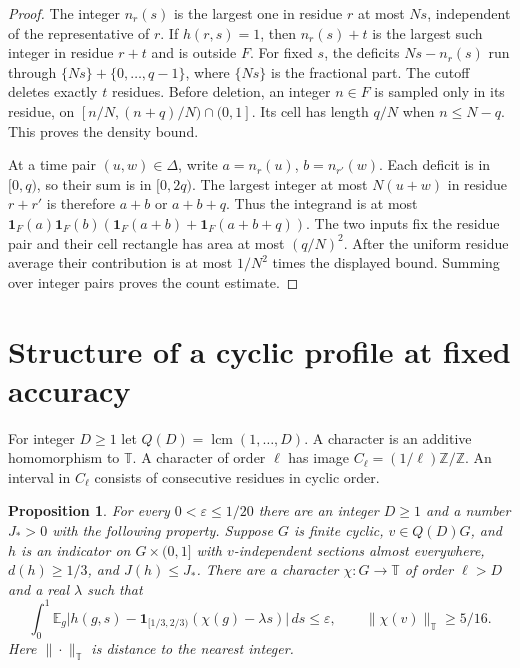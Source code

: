 \documentclass[11pt,reqno]{amsart}
\newtheorem{proposition}[theorem]{Proposition}
\DeclareMathOperator{\lcm}{lcm}
\newcommand{\Z}{\mathbb Z}
\newcommand{\T}{\mathbb T}
\newcommand{\E}{\mathbb E}
\newcommand{\ind}{\mathbf 1}
\numberwithin{equation}{section}
\begin{document}
\begin{proof}
The integer \(n_r(s)\) is the largest one in residue \(r\) at most
\(Ns\), independent of the representative of \(r\). If \(h(r,s)=1\),
then \(n_r(s)+t\) is the largest such integer in residue \(r+t\)
and is outside \(F\). For fixed \(s\), the deficits
\(Ns-n_r(s)\) run through \(\{Ns\}+\{0,\ldots,q-1\}\), where
\(\{Ns\}\) is the fractional part. The cutoff deletes exactly \(t\)
residues. Before deletion, an integer \(n\in F\) is sampled only
in its residue, on \([n/N,(n+q)/N)\cap(0,1]\). Its cell has
length \(q/N\) when \(n\le N-q\). This proves the density bound.

At a time pair \((u,w)\in\Delta\), write \(a=n_r(u)\),
\(b=n_{r'}(w)\). Each deficit is in \([0,q)\), so their sum
is in \([0,2q)\). The largest integer at most \(N(u+w)\) in
residue \(r+r'\) is therefore \(a+b\) or \(a+b+q\).
Thus the integrand is at most
\(\ind_F(a)\ind_F(b)(\ind_F(a+b)+\ind_F(a+b+q))\).
The two inputs fix the residue pair and their cell rectangle
has area at most \((q/N)^2\). After the uniform residue average
their contribution is at most \(1/N^2\) times the displayed
bound. Summing over integer pairs proves the count estimate.
\end{proof}

\section{Structure of a cyclic profile at fixed accuracy}\label{sec:structure}

For integer \(D\ge1\) let \(Q(D)=\lcm(1,\dots,D)\). A character is
an additive homomorphism to \(\T\). A character of order \(\ell\) has
image \(C_\ell=(1/\ell)\Z/\Z\). An interval in \(C_\ell\) consists of
consecutive residues in cyclic order.

\begin{proposition}\label{prop:structure}
For every \(0<\varepsilon\le1/20\) there are an integer \(D\ge1\) and
a number \(J_*>0\) with the following property. Suppose \(G\) is
finite cyclic, \(v\in Q(D)G\), and \(h\) is an indicator on
\(G\times(0,1]\) with \(v\)-independent sections almost everywhere,
\(d(h)\ge1/3\), and \(J(h)\le J_*\).
There are a character \(\chi:G\to\T\) of order \(\ell>D\) and a
real \(\lambda\) such that
\begin{equation}\label{eq:profile}
 \int_0^1\E_g\big|h(g,s)-\ind_{[1/3,2/3)}(\chi(g)-\lambda s)\big|\,ds
 \le\varepsilon,\qquad \|\chi(v)\|_{\T}\ge 5/16.
\end{equation}
Here \(\|\cdot\|_{\T}\) is distance to the nearest integer.
\end{proposition}
\end{document}
